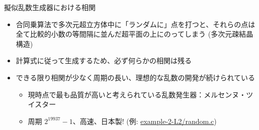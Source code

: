 \begin{frame}[t,fragile]{擬似乱数生成器における相関}
  \begin{itemize}
  \item 合同乗算法で多次元超立方体中に「ランダムに」点を打つと、それらの点は全て比較的小数の等間隔に並んだ超平面の上にのってしまう (多次元疎結晶構造)
  \item 計算式に従って生成するため、必ず何らかの相関は残る
  \item できる限り相関が少なく周期の長い、理想的な乱数の開発が続けられている
    \begin{itemize}
    \item 現時点で最も品質が高いと考えられている乱数発生器：メルセンヌ・ツイスター
    \item 周期 $2^{19937}-1$、高速、日本製! (例: \href{https://github.com/todo-group/computer-experiments/blob/master/exercise/monte_carlo/random.c}{example-2-L2/random.c})
    \end{itemize}
  \end{itemize}
\end{frame}

